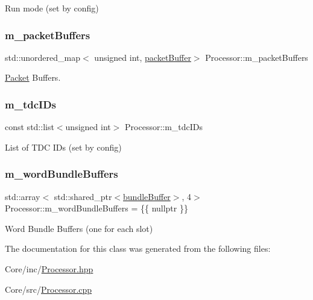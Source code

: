 Run mode (set by config) 

\mbox{\label{class_processor_ab75c789ec03e38e8621f000332daa285}} 
\subsubsection{\texorpdfstring{m\+\_\+packet\+Buffers}{m\_packetBuffers}}
{\footnotesize\ttfamily std\+::unordered\+\_\+map$<$ unsigned int, \hyperlink{class_processor_a0cfd8ed0721769db91c142a19a392e0f}{packet\+Buffer}$>$ Processor\+::m\+\_\+packet\+Buffers\hspace{0.3cm}{\ttfamily [private]}}



\hyperlink{class_packet}{Packet} Buffers. 

\mbox{\label{class_processor_a8eaa993665bf2a2ed71f84ffc0630574}} 
\subsubsection{\texorpdfstring{m\+\_\+tdc\+I\+Ds}{m\_tdcIDs}}
{\footnotesize\ttfamily const std\+::list$<$unsigned int$>$ Processor\+::m\+\_\+tdc\+I\+Ds\hspace{0.3cm}{\ttfamily [private]}}



List of T\+DC I\+Ds (set by config) 

\mbox{\label{class_processor_a8277cf1524daaa16f0dacfddd02ffd13}} 
\subsubsection{\texorpdfstring{m\+\_\+word\+Bundle\+Buffers}{m\_wordBundleBuffers}}
{\footnotesize\ttfamily std\+::array$<$ std\+::shared\+\_\+ptr$<$\hyperlink{class_processor_a531b4c5f7c0d810fc6e9e1dd3d115725}{bundle\+Buffer}$>$, 4$>$ Processor\+::m\+\_\+word\+Bundle\+Buffers = \{\{ nullptr \}\}\hspace{0.3cm}{\ttfamily [private]}}



Word Bundle Buffers (one for each slot) 



The documentation for this class was generated from the following files\+:\begin{DoxyCompactItemize}
\item 
Core/inc/\hyperlink{_processor_8hpp}{Processor.\+hpp}\item 
Core/src/\hyperlink{_processor_8cpp}{Processor.\+cpp}\end{DoxyCompactItemize}
